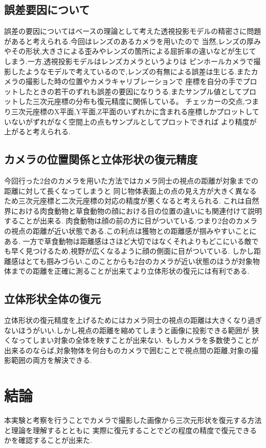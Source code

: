 \documentclass[11pt,a4j]{jsarticle}
\begin{document}
    \subsection{誤差要因について}
    誤差の要因についてはベースの理論として考えた透視投影モデルの精密さに問題があると考えられる.今回はレンズのあるカメラを用いたので
    当然,レンズの厚みやその形状,大きさによる歪みやレンズの箇所による屈折率の違いなどが生じてしまう.一方,透視投影モデルはレンズカメラというよりは
    ピンホールカメラで撮影したようなモデルで考えているので,レンズの有無による誤差は生じる.またカメラの撮影した時の位置やカメラキャリブレーションで
    座標を自分の手でプロットしたときの若干のずれも誤差の要因になりうる.またサンプル値としてプロットした三次元座標の分布も復元精度に関係している。
    チェッカーの交点,つまり三次元座標のX平面,Y平面,Z平面のいずれかに含まれる座標しかプロットしていないがずれがなく空間上の点もサンプルとしてプロットできれば
    より精度が上がると考えられる.
    \subsection{カメラの位置関係と立体形状の復元精度}
    今回行った2台のカメラを用いた方法ではカメラ同士の視点の距離が対象までの距離に対して長くなってしまうと
    同じ物体表面上の点の見え方が大きく異なるため三次元座標と二次元座標の対応の精度が悪くなると考えられる.
    これは自然界における肉食動物と草食動物の顔における目の位置の違いにも関連付けて説明することが出来る.
    肉食動物は顔の前の方に目がついている.つまり2台のカメラの視点の距離が近い状態である.この利点は獲物との距離感が掴みやすいことにある.
    一方で草食動物は距離感はさほど大切ではなくそれよりもどこにいる敵でも早く見つけるため,視野が広くなるように顔の側面に目がついている.
    しかし距離感はとても掴みづらい.このことからも2台のカメラが近い状態のほうが対象物体までの距離を正確に測ることが出来てより立体形状の復元には有利である.
    \subsection{立体形状全体の復元}
    立体形状の復元精度を上げるためにはカメラ同士の視点の距離は大きくなり過ぎないほうがいい.しかし視点の距離を縮めてしまうと画像に投影できる範囲が
    狭くなってしまい対象の全体を映すことが出来ない.
    もしカメラを多数使うことが出来るのならば,対象物体を何台ものカメラで囲むことで視点間の距離,対象の撮影範囲の両方を解決できる.

    \section{結論}
    本実験と考察を行うことでカメラで撮影した画像から三次元形状を復元する方法と理論を理解するとともに
    実際に復元することでどの程度の精度で復元できるかを確認することが出来た.
\end{document}
